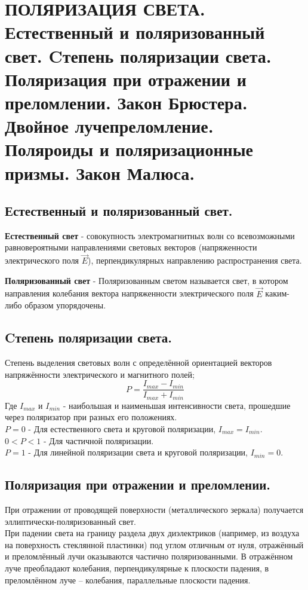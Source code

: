 \documentclass[12pt]{report}
\begin{document}
\setcounter{section}{29}
\section{ПОЛЯРИЗАЦИЯ СВЕТА. Естественный и поляризованный свет. Cтепень поляризации света. Поляризация при отражении и преломлении. Закон Брюстера. Двойное лучепреломление. Поляроиды и поляризационные призмы. Закон Малюса.}
\subsection{  Естественный и поляризованный свет.}
\textbf{Естественный свет} - совокупность электромагнитных волн со всевозможными равновероятными направлениями световых векторов (напряженности электрического поля $\overrightarrow{E}$), перпендикулярных направлению распространения света.

\textbf{Поляризованный свет} -  Поляризованным светом называется свет, в котором направления колебания вектора напряженности электрического поля $\overrightarrow{E}$  каким-либо образом упорядочены.
\subsection{  Cтепень поляризации света.}
Степень выделения световых волн с определённой ориентацией векторов напряжённости электрического и магнитного полей;
\[P=\frac{I_{max}-I_{min}}{I_{max}+I_{min}}\]
Где $I_{max}$ и $I_{min}$ - наибольшая и наименьшая интенсивности света, прошедшие через поляризатор при разных его положениях.\\
$P=0$ - Для естественного света и круговой поляризации, $I_{max}=I_{min}$.\\
$0<P<1$ - Для частичной поляризации.\\
$P=1$ - Для  линейной поляризации света и круговой поляризации,  $I_{min}=0$.
\subsection{  Поляризация при отражении и преломлении.}
При отражении от проводящей поверхности (металлического зеркала) получается эллиптически-поляризованный свет.\\
При падении света на границу раздела двух диэлектриков (например, из воздуха на поверхность стеклянной пластинки) под углом отличным от нуля, отражённый и преломлённый лучи оказываются частично поляризованными. В отражённом луче преобладают колебания, перпендикулярные к плоскости падения, в преломлённом луче – колебания, параллельные плоскости падения.
\end{document}
